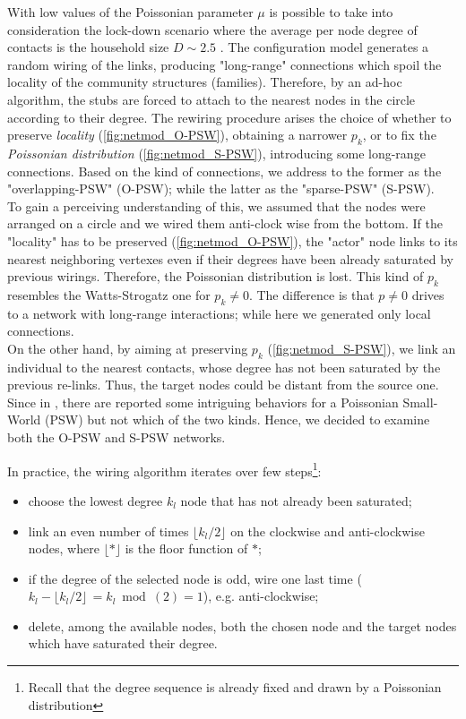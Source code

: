 \documentclass[a4paper,10pt]{book} %
\theoremstyle{definition}
\begin{document}
With low values of the Poissonian parameter $\mu$ is possible to take into consideration the lock-down scenario where the average per node degree of contacts is the household size $D \sim 2.5$ \cite{Thurner::NetBasedExpl}. The configuration model generates a random wiring of the links, producing "long-range" connections which spoil the locality of the community structures (families). Therefore, by an ad-hoc algorithm, the stubs are forced to attach to the nearest nodes in the circle according to their degree. 
The rewiring procedure arises the choice of whether to preserve \textit{locality}  (\autoref{fig:netmod_O-PSW}), obtaining a narrower $p_k$, or to fix the \textit{Poissonian distribution} (\autoref{fig:netmod_S-PSW}), introducing some long-range connections. Based on the kind of connections, we address to the former as the "overlapping-PSW" (O-PSW); while the latter as the "sparse-PSW" (S-PSW). \\
To gain a perceiving understanding of this, we assumed that the nodes were arranged on a circle and we wired them anti-clock wise from the bottom. If the "locality" has to be preserved (\autoref{fig:netmod_O-PSW}), the "actor" node links to its nearest neighboring vertexes even if their degrees have been already saturated by previous wirings. Therefore, the Poissonian distribution is lost. This kind of $ p_k$ resembles the Watts-Strogatz one for $ p_k \neq 0$. The difference is that $ p \neq 0$ drives to a network with long-range interactions; while here we generated only local connections.\\
On the other hand, by aiming at preserving $p_k$ (\autoref{fig:netmod_S-PSW}), we link an individual to the nearest contacts, whose degree has not been saturated by the previous re-links. Thus, the target nodes could be distant from the source one. Since in \cite{Thurner::Appendix_NetBasedExpl}, there are reported some intriguing behaviors for a Poissonian Small-World (PSW) but not which of the two kinds. Hence, we decided to examine both the O-PSW and S-PSW networks.

In practice, the wiring algorithm iterates over few steps\footnote{Recall that the degree sequence is already fixed and drawn by a Poissonian distribution}:
\begin{itemize}
	\item choose the lowest degree $k_l$ node that has not already been saturated;
	\item link an even number of times $\lfloor k_l /2 \rfloor$ on the clockwise and anti-clockwise nodes, where $\lfloor * \rfloor$ is the floor function of $*$;
	\item if the degree of the selected node is odd, wire one last time ($k_l - \lfloor k_l /2 \rfloor \, = k_l \bmod(2) =  1$), e.g. anti-clockwise;
	\item delete, among the available nodes, both the chosen node and the target nodes which have saturated their degree.
\end{itemize}
\end{document}
